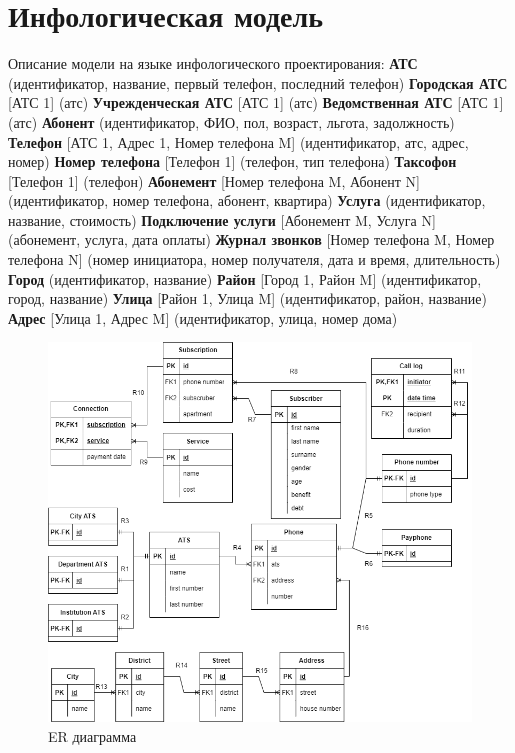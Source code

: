\documentclass{report}
\begin{document}
\section{Инфологическая модель}
Описание модели на языке инфологического проектирования:
\newline\textbf{АТС} (идентификатор, название, первый телефон, последний телефон)
\newline\textbf{Городская АТС} [АТС 1] (атс)
\newline\textbf{Учрежденческая АТС} [АТС 1] (атс)
\newline\textbf{Ведомственная АТС} [АТС 1] (атс)
\newline\textbf{Абонент} (идентификатор, ФИО, пол, возраст, льгота, задолжность)
\newline\textbf{Телефон} [АТС 1, Адрес 1, Номер телефона M] (идентификатор, атс, адрес, номер)
\newline\textbf{Номер телефона} [Телефон 1] (телефон, тип телефона)
\newline\textbf{Таксофон} [Телефон 1] (телефон)
\newline\textbf{Абонемент} [Номер телефона M, Абонент N] (идентификатор, 
номер телефона, абонент, квартира)
\newline\textbf{Услуга} (идентификатор, название, стоимость)
\newline\textbf{Подключение услуги} [Абонемент M, Услуга N] (абонемент, услуга, дата оплаты)
\newline\textbf{Журнал звонков} [Номер телефона M, Номер телефона N] 
(номер инициатора, номер получателя, дата и время, длительность)
\newline\textbf{Город} (идентификатор, название)
\newline\textbf{Район} [Город 1, Район M] (идентификатор, город, название)
\newline\textbf{Улица} [Район 1, Улица M] (идентификатор, район, название)
\newline\textbf{Адрес} [Улица 1, Адрес M] (идентификатор, улица, номер дома)

\begin{figure}[!ht]
    \begin{center}
    \includegraphics[width=\textwidth]{resources/er.png}
    \caption{ER диаграмма}
    \end{center}
\end{figure}
\end{document}
